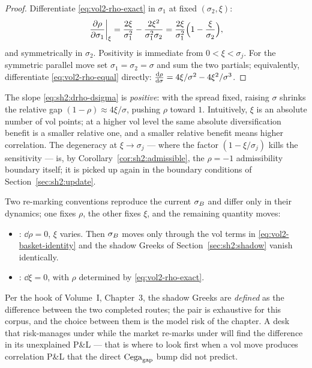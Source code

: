 \begin{proof}
Differentiate \eqref{eq:vol2-rho-exact} in $\sigma_1$ at fixed
$(\sigma_2, \xi)$:
\[
  \left.\frac{\partial \rho}{\partial \sigma_1}\right|_{\xi}
  = \frac{2\xi}{\sigma_1^2} - \frac{2\xi^2}{\sigma_1^2 \sigma_2}
  = \frac{2\xi}{\sigma_1^2}\Bigl(1 - \frac{\xi}{\sigma_2}\Bigr),
\]
and symmetrically in $\sigma_2$. Positivity is immediate from
$0 < \xi < \sigma_j$. For the symmetric parallel move set
$\sigma_1 = \sigma_2 = \sigma$ and sum the two partials; equivalently,
differentiate \eqref{eq:vol2-rho-equal} directly:
$\frac{\mathrm{d} \rho}{\mathrm{d} \sigma} = 4\xi/\sigma^2 - 4\xi^2/\sigma^3$.
\end{proof}

\begin{remark}[Sign]\label{rem:sh2:sign}
The slope \eqref{eq:sh2:drho-dsigma} is \emph{positive}: with the spread
fixed, raising $\sigma$ shrinks the relative gap
$(1 - \rho) \approx 4\xi/\sigma$, pushing $\rho$ toward $1$. Intuitively,
$\xi$ is an absolute number of vol points; at a higher vol level the same
absolute diversification benefit is a smaller relative one, and a smaller
relative benefit means higher correlation. The degeneracy at
$\xi \to \sigma_j$ --- where the factor $(1 - \xi/\sigma_j)$ kills the
sensitivity --- is, by Corollary~\ref{cor:sh2:admissible}, the $\rho = -1$
admissibility boundary itself; it is picked up again in the boundary
conditions of Section~\ref{sec:sh2:update}.
\end{remark}

\begin{remark}
\label{rem:sh2:two-conventions}
Two re-marking conventions reproduce the current $\sigma_B$ and differ only in
their dynamics; one fixes $\rho$, the other fixes $\xi$, and the remaining
quantity moves:
\begin{itemize}[leftmargin=1.5em]
\item \stickyrho{}: $\dd\rho = 0$, $\xi$ varies. Then $\sigma_B$ moves only
  through the vol terms in \eqref{eq:vol2-basket-identity} and the shadow
  Greeks of Section~\ref{sec:sh2:shadow} vanish identically.
\item \stickycvc{}: $\dd\xi = 0$, with $\rho$ determined by
  \eqref{eq:vol2-rho-exact}.
\end{itemize}
Per the hook of Volume~I, Chapter~3, the shadow Greeks are \emph{defined}
as the difference between the two completed routes; the pair is exhaustive
for this corpus, and the choice between them is the model risk of the
chapter. A desk that risk-manages under \stickyrho{} while the market
re-marks under \stickycvc{} will find the difference in its unexplained
P\&L --- that is where to look first when a vol move produces correlation
P\&L that the direct $\mathrm{Cega}_{\mathrm{gap}}$ bump did not predict.
\end{remark}

